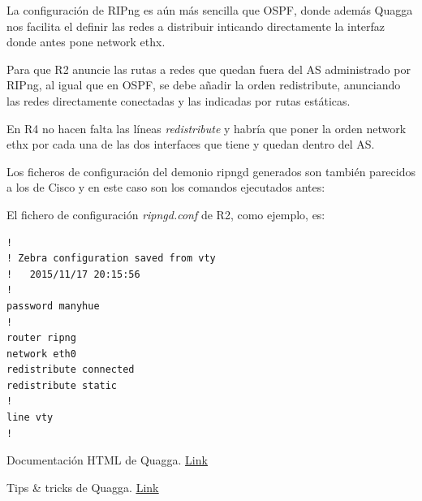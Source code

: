\documentclass{article}
\begin{document}
La configuración de RIPng es aún más sencilla que OSPF, donde además Quagga nos facilita el definir las redes a distribuir inticando directamente la interfaz donde antes pone network ethx.

Para que R2 anuncie las rutas a redes que quedan fuera del AS administrado por RIPng, al igual que en OSPF, se debe añadir la orden redistribute, anunciando las redes directamente conectadas y las indicadas por rutas estáticas.

En R4 no hacen falta las líneas \textit{redistribute} y habría que poner la orden network ethx por cada una de las dos interfaces que tiene y quedan dentro del AS.

Los ficheros de configuración del demonio ripngd generados son también parecidos a los de Cisco y en este caso son los comandos ejecutados antes:


\hfil

El fichero de configuración \textit{ripngd.conf} de R2, como ejemplo, es:

\begin{lstlisting}
!
! Zebra configuration saved from vty
!   2015/11/17 20:15:56
!
password manyhue
!
router ripng
network eth0
redistribute connected
redistribute static
!
line vty
!
\end{lstlisting}




\begin{thebibliography}{99}
	Documentación HTML de Quagga.  \hyperref{http://www.nongnu.org/quagga/docs/docs-info.html}{}{}{\underline{Link}}
	
	Tips \& tricks de Quagga. 
	\hyperref{https://wiki.quagga.net/wiki/index.php/TipsNTricks}{}{}{\underline{Link}}
	
\end{thebibliography}
\end{document}
